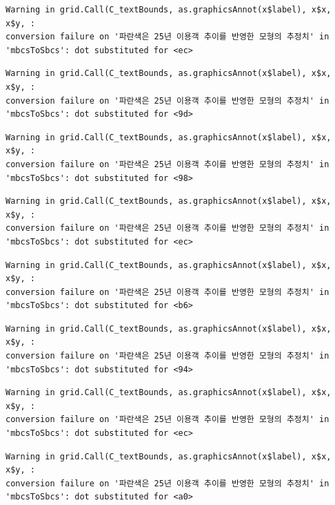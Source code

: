 \documentclass[
  letterpaper,
  DIV=11,
  numbers=noendperiod]{scrreprt}
\begin{document}
\begin{verbatim}
Warning in grid.Call(C_textBounds, as.graphicsAnnot(x$label), x$x, x$y, :
conversion failure on '파란색은 25년 이용객 추이를 반영한 모형의 추정치' in
'mbcsToSbcs': dot substituted for <ec>
\end{verbatim}

\begin{verbatim}
Warning in grid.Call(C_textBounds, as.graphicsAnnot(x$label), x$x, x$y, :
conversion failure on '파란색은 25년 이용객 추이를 반영한 모형의 추정치' in
'mbcsToSbcs': dot substituted for <9d>
\end{verbatim}

\begin{verbatim}
Warning in grid.Call(C_textBounds, as.graphicsAnnot(x$label), x$x, x$y, :
conversion failure on '파란색은 25년 이용객 추이를 반영한 모형의 추정치' in
'mbcsToSbcs': dot substituted for <98>
\end{verbatim}

\begin{verbatim}
Warning in grid.Call(C_textBounds, as.graphicsAnnot(x$label), x$x, x$y, :
conversion failure on '파란색은 25년 이용객 추이를 반영한 모형의 추정치' in
'mbcsToSbcs': dot substituted for <ec>
\end{verbatim}

\begin{verbatim}
Warning in grid.Call(C_textBounds, as.graphicsAnnot(x$label), x$x, x$y, :
conversion failure on '파란색은 25년 이용객 추이를 반영한 모형의 추정치' in
'mbcsToSbcs': dot substituted for <b6>
\end{verbatim}

\begin{verbatim}
Warning in grid.Call(C_textBounds, as.graphicsAnnot(x$label), x$x, x$y, :
conversion failure on '파란색은 25년 이용객 추이를 반영한 모형의 추정치' in
'mbcsToSbcs': dot substituted for <94>
\end{verbatim}

\begin{verbatim}
Warning in grid.Call(C_textBounds, as.graphicsAnnot(x$label), x$x, x$y, :
conversion failure on '파란색은 25년 이용객 추이를 반영한 모형의 추정치' in
'mbcsToSbcs': dot substituted for <ec>
\end{verbatim}

\begin{verbatim}
Warning in grid.Call(C_textBounds, as.graphicsAnnot(x$label), x$x, x$y, :
conversion failure on '파란색은 25년 이용객 추이를 반영한 모형의 추정치' in
'mbcsToSbcs': dot substituted for <a0>
\end{verbatim}
\end{document}
